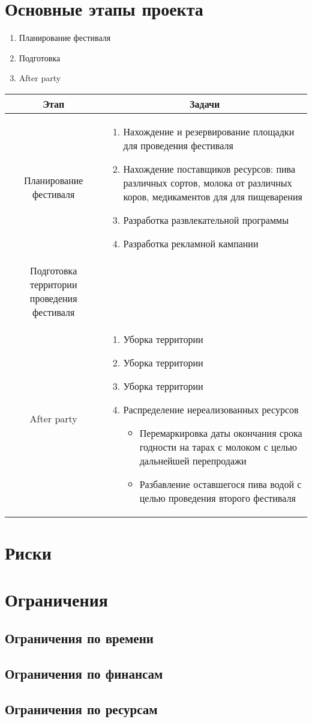 \documentclass[a4paper,12pt]{article}
\begin{document}
\section{Основные этапы проекта}
\begin{enumerate}
  \item{Планирование фестиваля}
  \item{Подготовка }
  \item{After party}
\end{enumerate}
\begin{tabular}{|c|p{10cm}|}
  \hline
  \textbf{Этап} & \multicolumn{1}{|c|}{\textbf{Задачи}}\\
  \hline
  Планирование фестиваля & 
  \begin{enumerate}
    \item Нахождение и резервирование площадки для проведения фестиваля
    \item Нахождение поставщиков ресурсов: пива различных сортов, молока от различных коров, медикаментов для для пищеварения 
    \item Разработка развлекательной программы 
    \item Разработка рекламной кампании
  \end{enumerate} \\
  \hline
  Подготовка территории проведения фестиваля& 
  \begin{enumerate}
    \item Установка  
    \\
  \hline
  After party & 
  \begin{enumerate}
    \item Уборка территории
    \item Уборка территории
    \item Уборка территории
    \item Распределение нереализованных ресурсов
      \begin{itemize}
        \item Перемаркировка даты окончания срока годности на тарах с молоком с целью дальнейшей перепродажи
        \item Разбавление оставшегося пива водой с целью проведения второго фестиваля
      \end{itemize}
  \end{enumerate}\\
  \hline
\end{tabular}
\section{Риски}
\section{Ограничения}
\subsection{Ограничения по времени}
\subsection{Ограничения по финансам}
\subsection{Ограничения по ресурсам}
\end{document}
